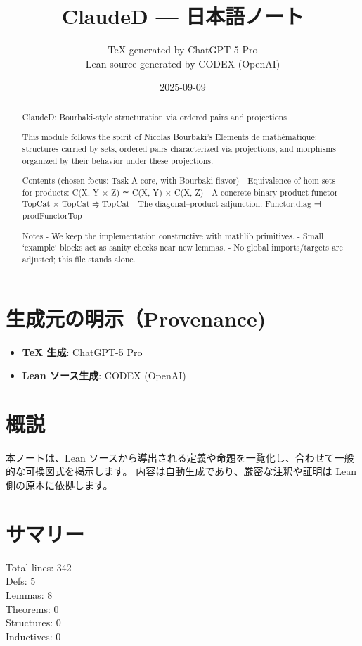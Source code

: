 \documentclass[12pt]{article}
\title{ClaudeD — 日本語ノート}
\author{TeX generated by ChatGPT-5 Pro\\Lean source generated by CODEX (OpenAI)}
\date{2025-09-09}
\theoremstyle{definition}
\begin{document}
\maketitle

\begin{abstract}
ClaudeD: Bourbaki-style structuration via ordered pairs and projections

  This module follows the spirit of Nicolas Bourbaki's Elements de mathématique:
  structures carried by sets, ordered pairs characterized via projections, and
  morphisms organized by their behavior under these projections.

  Contents (chosen focus: Task A core, with Bourbaki flavor)
  - Equivalence of hom-sets for products: C(X, Y × Z) ≃ C(X, Y) × C(X, Z)
  - A concrete binary product functor TopCat × TopCat ⥤ TopCat
  - The diagonal–product adjunction: Functor.diag ⊣ prodFunctorTop

  Notes
  - We keep the implementation constructive with mathlib primitives.
  - Small `example` blocks act as sanity checks near new lemmas.
  - No global imports/targets are adjusted; this file stands alone.
\end{abstract}

\section*{生成元の明示（Provenance)}
\begin{itemize}
  \item \textbf{TeX 生成}: ChatGPT-5 Pro
  \item \textbf{Lean ソース生成}: CODEX (OpenAI)
\end{itemize}

\section*{概説}
本ノートは、Lean ソースから導出される定義や命題を一覧化し、合わせて一般的な可換図式を掲示します。
内容は自動生成であり、厳密な注釈や証明は Lean 側の原本に依拠します。

\section*{サマリー}
Total lines: 342\\
Defs: 5\\
Lemmas: 8\\
Theorems: 0\\
Structures: 0\\
Inductives: 0
\end{document}
